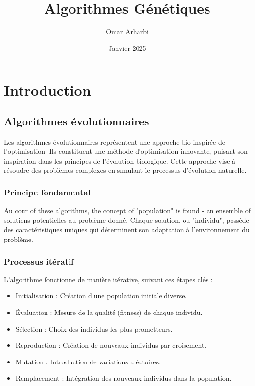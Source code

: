 \documentclass{article}
\title{Algorithmes Génétiques}
\author{Omar Arharbi}
\date{Janvier 2025}
\begin{document}
\maketitle

\section{Introduction}
\subsection{Algorithmes évolutionnaires}

Les algorithmes évolutionnaires représentent une approche bio-inspirée de l'optimisation. Ils constituent une méthode d'optimisation innovante, puisant son inspiration dans les principes de l'évolution biologique. Cette approche vise à résoudre des problèmes complexes en simulant le processus d'évolution naturelle.

\subsubsection{Principe fondamental}

Au cour of these algorithms, the concept of "population" is found - an ensemble of solutions potentielles au problème donné. Chaque solution, ou "individu", possède des caractéristiques uniques qui déterminent son adaptation à l'environnement du problème.

\subsubsection{Processus itératif}

L'algorithme fonctionne de manière itérative, suivant ces étapes clés :

\begin{itemize}
    \item Initialisation : Création d'une population initiale diverse.
    \item Évaluation : Mesure de la qualité (fitness) de chaque individu.
    \item Sélection : Choix des individus les plus prometteurs.
    \item Reproduction : Création de nouveaux individus par croisement.
    \item Mutation : Introduction de variations aléatoires.
    \item Remplacement : Intégration des nouveaux individus dans la population.
\end{itemize}
\end{document}
